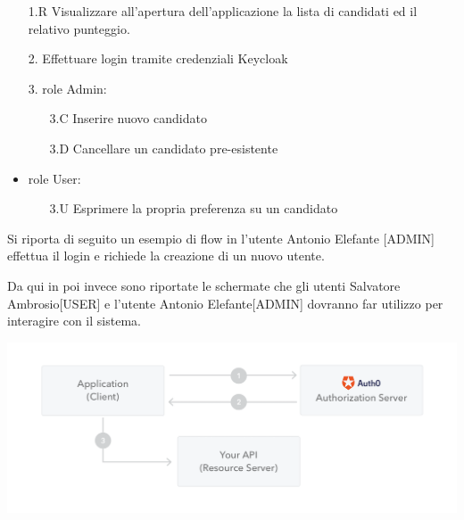 \documentclass[twoside]{report}
\begin{document}
\begin{itemize}

\item[1.R] Visualizzare all'apertura dell'applicazione la lista di candidati ed il relativo punteggio.
\item[2.] Effettuare login tramite credenziali Keycloak
\item[3.] role Admin:
    \begin{itemize}
        \item[3.C] Inserire nuovo candidato
        \item[3.D] Cancellare un candidato pre-esistente
    \end{itemize}
\item role User:
    \begin{itemize}
        \item[3.U] Esprimere la propria preferenza su un candidato
    \end{itemize}
\end{itemize}

Si riporta di seguito un esempio di flow in l'utente Antonio Elefante [ADMIN] effettua il login e richiede la creazione di un nuovo utente.


\newpage

Da qui in poi invece sono riportate le schermate che gli utenti Salvatore Ambrosio[USER] e l'utente Antonio Elefante[ADMIN] dovranno far utilizzo per interagire con il sistema.
\bigbreak
\begin{minipage}{\linewidth}
    \vspace{2mm}
    \centering
    \includegraphics[width= 0.5 \linewidth]{2.png}
    \vspace{2mm}
\end{minipage}
\end{document}
